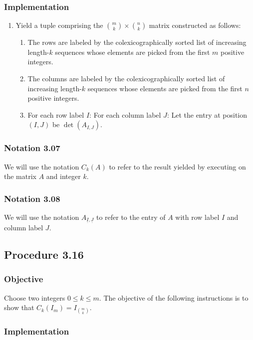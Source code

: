 \documentclass[twocolumn]{article}
\newcommand{\ul}[1]{\underline{#1}}
\newcommand{\notation}[1]{\subsubsection*{Notation #1}}
\newcommand{\procedure}[2][]{\subsection*{Procedure #2 \ifthenelse{\equal{#1}{}}{}{(#1)}}\label{sec:procedure #2}}
\newcommand{\objective}{\subsubsection*{Objective}}
\newcommand{\implementation}{\subsubsection*{Implementation}}
\newcommand{\procedurehr}[2][]{\hyperref[sec:procedure #2]{\ifthenelse{\equal{#1}{}}{procedure #2}{#1}}}
\begin{document}
			\implementation
				\begin{enumerate}
					\item Yield a tuple comprising the $\binom{m}{k}\times\binom{n}{k}$ matrix constructed as follows:
					\begin{enumerate}
						\item The rows are labeled by the colexicographically sorted list of increasing length-$k$ sequences whose elements are picked from the first $m$ positive integers.
						\item The columns are labeled by the colexicographically sorted list of increasing length-$k$ sequences whose elements are picked from the first $n$ positive integers.
						\item For each row label $I$: For each column label $J$: Let the entry at position $(I,J)$ be $\det(A_{I,J})$.
					\end{enumerate}
				\end{enumerate}
		\notation{3.07}
			We will use the notation $C_k(A)$ to refer to the result yielded by executing \procedurehr{3.15} on the matrix $A$ and integer $k$.
		\notation{3.08}
			We will use the notation $A_{\ul{I},\ul{J}}$ to refer to the entry of $A$ with row label $I$ and column label $J$.
		\procedure{3.16}
			\objective
				Choose two integers $0\le k\le m$. The objective of the following instructions is to show that $C_k(I_m)=I_{\binom{m}{k}}$.
			\implementation
\end{document}
